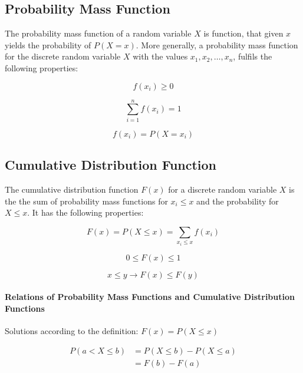 \documentclass[a4paper, 10pt]{article}
\begin{document}
	\subsection{Probability Mass Function}

	The probability mass function of a random variable \(X\) is function, that given \(x\) yields the probability of \(P(X=x)\). More generally, a probability mass function for the discrete random variable \(X\) with the values \(x_{1}, x_{2},\ldots ,x_{n}\), fulfils the following properties:

	\begin{equation*}
		f(x_{i})\geq 0
	\end{equation*}

	\begin{equation*}
		\sum_{i=1}^{n}f(x_{i})=1
	\end{equation*}

	\begin{equation*}
		f(x_{i})=P(X=x_{i})
	\end{equation*}

	\subsection{Cumulative Distribution Function}

	The cumulative distribution function \(F(x)\) for a discrete random variable \(X\) is the the sum of probability mass functions for \(x_{i}\leq x\) and the probability for \(X\leq x\). It has the following properties:

	\begin{equation*}
		F(x)=P(X\leq x)=\sum_{x_{i}\leq x}f(x_{i})
	\end{equation*}

	\begin{equation*}
		0\leq F(x)\leq 1
	\end{equation*}

	\begin{equation*}
		x\leq y \rightarrow F(x)\leq F(y)
	\end{equation*}

	\paragraph{Relations of Probability Mass Functions and Cumulative Distribution Functions}

	Solutions according to the definition: \(F(x)=P(X\leq x)\)

	\begin{align*}
		P(a < X \leq b) &= P(X\leq b) - P(X\leq a) \\
		&= F(b) - F(a)
	\end{align*}
\end{document}

